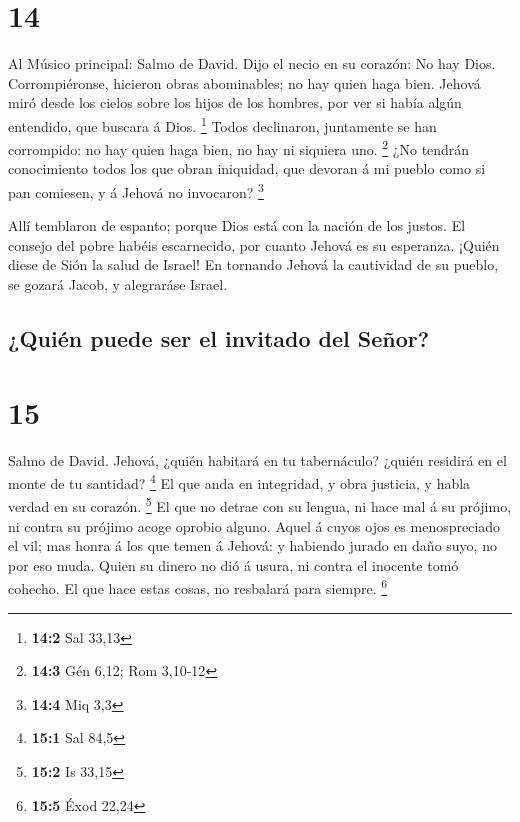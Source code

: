 \hypertarget{section-13}{%
\section{14}\label{section-13}}

 Al Músico principal: Salmo de David. Dijo el necio en su
corazón: No hay Dios. Corrompiéronse, hicieron obras abominables; no hay
quien haga bien.  Jehová miró desde los cielos sobre los
hijos de los hombres, por ver si había algún entendido, que buscara á
Dios. \footnote{\textbf{14:2} Sal 33,13}  Todos declinaron,
juntamente se han corrompido: no hay quien haga bien, no hay ni siquiera
uno. \footnote{\textbf{14:3} Gén 6,12; Rom 3,10-12}  ¿No
tendrán conocimiento todos los que obran iniquidad, que devoran á mi
pueblo como si pan comiesen, y á Jehová no invocaron? \footnote{\textbf{14:4}
  Miq 3,3}

 Allí temblaron de espanto; porque Dios está con la nación
de los justos.  El consejo del pobre habéis escarnecido, por
cuanto Jehová es su esperanza.  ¡Quién diese de Sión la
salud de Israel! En tornando Jehová la cautividad de su pueblo, se
gozará Jacob, y alegraráse Israel.

\hypertarget{quiuxe9n-puede-ser-el-invitado-del-seuxf1or}{%
\subsection{¿Quién puede ser el invitado del
Señor?}\label{quiuxe9n-puede-ser-el-invitado-del-seuxf1or}}

\hypertarget{section-14}{%
\section{15}\label{section-14}}

 Salmo de David. Jehová, ¿quién habitará en tu tabernáculo?
¿quién residirá en el monte de tu santidad? \footnote{\textbf{15:1} Sal
  84,5}  El que anda en integridad, y obra justicia, y habla
verdad en su corazón. \footnote{\textbf{15:2} Is 33,15}  El
que no detrae con su lengua, ni hace mal á su prójimo, ni contra su
prójimo acoge oprobio alguno.  Aquel á cuyos ojos es
menospreciado el vil; mas honra á los que temen á Jehová: y habiendo
jurado en daño suyo, no por eso muda.  Quien su dinero no
dió á usura, ni contra el inocente tomó cohecho. El que hace estas
cosas, no resbalará para siempre. \footnote{\textbf{15:5} Éxod 22,24}

